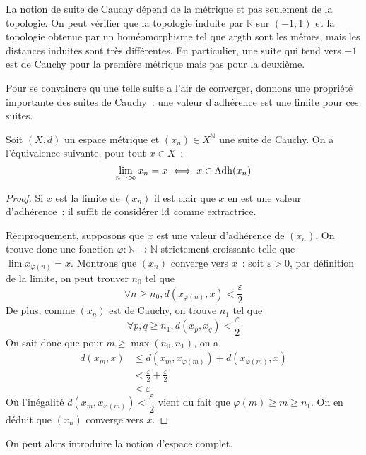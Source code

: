 \begin{remark}
  La notion de suite de Cauchy dépend de la métrique et pas seulement de la
  topologie. On peut vérifier que la topologie induite par $\mathbb R$ sur
  $(-1,1)$ et la topologie obtenue par un homéomorphisme tel que
  $\mathrm{argth}$ sont les mêmes, mais les distances induites sont très
  différentes. En particulier, une suite qui tend vers $-1$ est de Cauchy pour
  la première métrique mais pas pour la deuxième.
\end{remark}

Pour se convaincre qu'une telle suite a l'air de converger, donnons une
propriété importante des suites de Cauchy~: une valeur d'adhérence est une
limite pour ces suites.

\begin{property}\label{prop.cauchy.adh}
  Soit $(X,d)$ un espace métrique et $(x_n)\in X^\mathbb N$ une suite de
  Cauchy. On a l'équivalence suivante, pour tout $x \in X$~:
  \[\lim_{n\to\infty} x_n = x \iff x \in \operatorname{Adh}(x_n)\]
\end{property}

\begin{proof}
  Si $x$ est la limite de $(x_n)$ il est clair que $x$ en est une valeur
  d'adhérence~: il suffit de considérer $\operatorname{id}$ comme extractrice.

  Réciproquement, supposons que $x$ est une valeur d'adhérence de $(x_n)$. On
  trouve donc une fonction $\varphi : \mathbb N \to \mathbb N$ strictement
  croissante telle que $\lim x_{\varphi(n)} = x$. Montrons que $(x_n)$ converge
  vers $x$~: soit $\varepsilon > 0$, par définition de la limite, on peut
  trouver $n_0$ tel que
  \[\forall n \geq n_0, d(x_{\varphi(n)},x) < \frac{\varepsilon}{2}\]
  De plus, comme $(x_n)$ est de Cauchy, on trouve $n_1$ tel que
  \[\forall p,q \geq n_1, d(x_p,x_q) < \frac{\varepsilon}{2}\]
  On sait donc que pour $m \geq \max(n_0,n_1)$, on a
  \begin{align*}
    d(x_m,x) &\leq d(x_m,x_{\varphi(m)}) + d(x_{\varphi(m)},x) \\
    &< \frac{\varepsilon}{2} + \frac{\varepsilon}{2}\\
    &< \varepsilon
  \end{align*}
  Où l'inégalité $d(x_m,x_{\varphi(m)}) < \dfrac{\varepsilon}{2}$ vient du
  fait que $\varphi(m) \geq m \geq n_1$. On en déduit que $(x_n)$ converge vers
  $x$.
\end{proof}

On peut alors introduire la notion d'espace complet.

